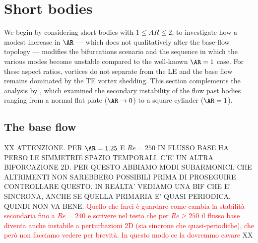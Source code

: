 \section{Short bodies}
\label{sec:short}

We begin by considering short bodies with $1 \le AR \le 2$, to investigate how a modest increase in $\AR$ --- which does not qualitatively alter the base-flow topology --- modifies the bifurcations scenario and the sequence in which the various modes become unstable compared to the well-known $\AR=1$ case. For these aspect ratios, vortices do not separate from the LE and the base flow remains dominated by the TE vortex shedding. This section complements the analysis by \cite{choi-yang-2014}, which examined the secondary instability of the flow past bodies ranging from a normal flat plate ($\AR \rightarrow 0$) to a square cylinder ($\AR=1$).

\subsection{The base flow}

XX ATTENZIONE. PER $\AR=1.25$ E $Re=250$ IN FLUSSO BASE HA PERSO LE SIMMETRIE SPAZIO TEMPORALI. C'E' UN ALTRA BIFORCAZIONE 2D. PER QUESTO ABBIAMO MODI SUBARMONICI. CHE ALTRIMENTI NON SAREBBERO POSSIBILI PRIMA DI PROSEGUIRE CONTROLLARE QUESTO. IN REALTA' VEDIAMO UNA BIF CHE E' SINCRONA, ANCHE SE QUELLA PRIMARIA E' QUASI PERIODICA. QUINDI NON VA BENE. \textcolor{red}{Quello che farei è guardare come cambia la stabilità secondaria fino a $Re=240$ e scrivere nel testo che per $Re \ge 250$ il flusso base diventa anche instabile a perturbazioni 2D (sia sincrone che quasi-periodiche), che però non facciamo vedere per brevità. In questo modo ce la dovremmo cavare} XX


